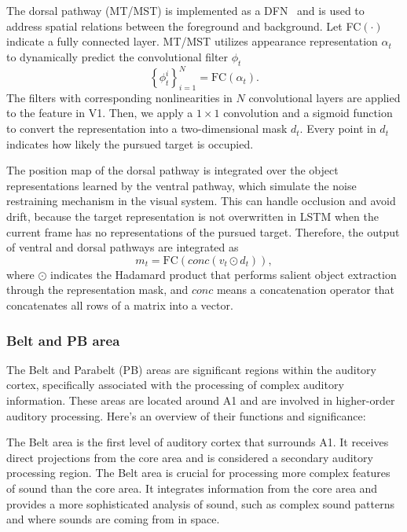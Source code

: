\documentclass[journal]{IEEEtran}
\begin{document}
The dorsal pathway (MT/MST) is implemented as a DFN~\cite{brabandere2016dynamic} 
and is used to address spatial relations between the foreground and background. 
Let FC$(\cdot)$ indicate a fully connected layer.
MT/MST utilizes appearance representation $\alpha_t$ to dynamically predict the convolutional filter $\phi_t$
\begin{equation}
	\left\{ \phi _t ^i \right\}_{i=1}^N = \text{FC}(\alpha_t).
\end{equation}
The filters with corresponding nonlinearities in $N$ convolutional layers are applied to the feature in V1. 
Then, we apply a $1 \times 1$ convolution and a sigmoid function to convert the representation into a two-dimensional mask $d_t$.
Every point in $d_t$ indicates how likely the pursued target is occupied.

The position map of the dorsal pathway is integrated over the object representations learned by the ventral pathway, which simulate the noise restraining mechanism in the visual system. 
This can handle occlusion and avoid drift, because the target representation is not overwritten in LSTM when the current frame has no representations of the pursued target. 
Therefore, the output of ventral and dorsal pathways are integrated as
\begin{equation}
	m_t = \text{FC}(conc(v_t \odot d_t)),
\end{equation}
where $\odot$ indicates the Hadamard product that performs salient object extraction through the representation mask, 
and $conc$ means a concatenation operator that concatenates all rows of a matrix into a vector.

\subsubsection{Belt and PB area}

The Belt and Parabelt (PB) areas are significant regions within the auditory cortex, specifically associated with the processing of complex auditory information. 
These areas are located around A1 and are involved in higher-order auditory processing.
Here's an overview of their functions and significance:

The Belt area is the first level of auditory cortex that surrounds A1.
It receives direct projections from the core area and is considered a secondary auditory processing region.
The Belt area is crucial for processing more complex features of sound than the core area. 
It integrates information from the core area and provides a more sophisticated analysis of sound, such as complex sound patterns and where sounds are coming from in space.
\end{document}
